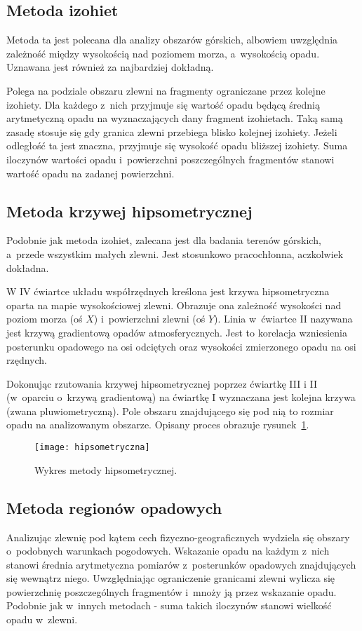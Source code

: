 \subsection{Metoda izohiet}
Metoda ta jest polecana dla analizy obszarów górskich, albowiem uwzględnia zależność między wysokością nad poziomem morza, a~wysokością opadu. Uznawana jest również za najbardziej dokładną.

Polega na podziale obszaru zlewni na fragmenty ograniczane przez kolejne izohiety. Dla każdego z~nich przyjmuje się wartość opadu będącą średnią arytmetyczną opadu na wyznaczających dany fragment izohietach. Taką samą zasadę stosuje się gdy granica zlewni przebiega blisko kolejnej izohiety. Jeżeli odległość ta jest znaczna, przyjmuje się wysokość opadu bliższej izohiety. Suma iloczynów wartości opadu i~powierzchni poszczególnych fragmentów stanowi wartość opadu na zadanej powierzchni.


\subsection{Metoda krzywej hipsometrycznej}
Podobnie jak metoda izohiet, zalecana jest dla badania terenów górskich, a~przede wszystkim małych zlewni. Jest stosunkowo pracochłonna, aczkolwiek dokładna.

W IV ćwiartce układu współrzędnych kreślona jest krzywa hipsometryczna oparta na mapie wysokościowej zlewni. Obrazuje ona zależność wysokości nad poziom morza (oś $X$) i~powierzchni zlewni (oś $Y$). Linia w~ćwiartce II nazywana jest krzywą gradientową opadów atmosferycznych. Jest to korelacja wzniesienia posterunku opadowego na osi odciętych oraz wysokości zmierzonego opadu na osi rzędnych.

Dokonując rzutowania krzywej hipsometrycznej poprzez ćwiartkę III i II (w~oparciu o~krzywą gradientową) na ćwiartkę I wyznaczana jest kolejna krzywa (zwana pluwiometryczną). Pole obszaru znajdującego się pod nią to rozmiar opadu na analizowanym obszarze. Opisany proces obrazuje rysunek~\ref{fig:hipsometryczna}.

\begin{figure}[!ht]
\centering
\texttt{[image: hipsometryczna]}
\caption{Wykres metody hipsometrycznej.}
\label{fig:hipsometryczna}
\end{figure}

\subsection{Metoda regionów opadowych}
Analizując zlewnię pod kątem cech fizyczno-geograficznych wydziela się obszary o~podobnych warunkach pogodowych. Wskazanie opadu na każdym z~nich stanowi średnia arytmetyczna pomiarów z~posterunków opadowych znajdujących się wewnątrz niego. Uwzględniając ograniczenie granicami zlewni wylicza się powierzchnię poszczególnych fragmentów i~mnoży ją przez wskazanie opadu. Podobnie jak w~innych metodach - suma takich iloczynów stanowi wielkość opadu w~zlewni.

